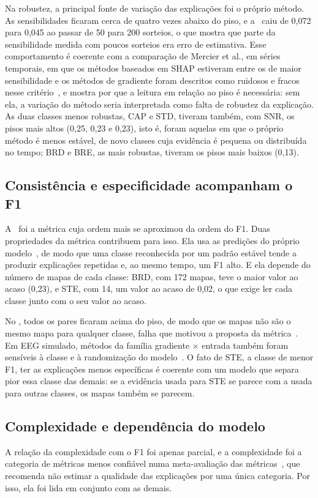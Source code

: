 Na robustez, a principal fonte de variação das explicações foi o próprio método. As sensibilidades ficaram cerca de quatro vezes abaixo do piso, e a \MS\ caiu de 0,072 para 0,045 ao passar de 50 para 200 sorteios, o que mostra que parte da sensibilidade medida com poucos sorteios era erro de estimativa. Esse comportamento é coerente com a comparação de Mercier et al., em séries temporais, em que os métodos baseados em SHAP estiveram entre os de maior sensibilidade e os métodos de gradiente foram descritos como ruidosos e fracos nesse critério~\cite{mercier2022}, e mostra por que a leitura em relação ao piso é necessária: sem ela, a variação do método seria interpretada como falta de robustez da explicação. As duas classes menos robustas, CAP e STD, tiveram também, com SNR, os pisos mais altos (0,25, 0,23 e 0,23), isto é, foram aquelas em que o próprio método é menos estável, de novo classes cuja evidência é pequena ou distribuída no tempo; BRD e BRE, as mais robustas, tiveram os pisos mais baixos (0,13).

\subsection{Consistência e especificidade acompanham o F1}
A \CS\ foi a métrica cuja ordem mais se aproximou da ordem do F1. Duas propriedades da métrica contribuem para isso. Ela usa as predições do próprio modelo~\cite{dasgupta2022}, de modo que uma classe reconhecida por um padrão estável tende a produzir explicações repetidas e, ao mesmo tempo, um F1 alto. E ela depende do número de mapas de cada classe: BRD, com 172 mapas, teve o maior valor ao acaso (0,23), e STE, com 14, um valor ao acaso de 0,02, o que exige ler cada classe junto com o seu valor ao acaso.

No \RL, todos os pares ficaram acima do piso, de modo que os mapas não são o mesmo mapa para qualquer classe, falha que motivou a proposta da métrica~\cite{sixt2020}. Em EEG simulado, métodos da família gradiente × entrada também foram sensíveis à classe e à randomização do modelo~\cite{ravindran2023}. O fato de STE, a classe de menor F1, ter as explicações menos específicas é coerente com um modelo que separa pior essa classe das demais: se a evidência usada para STE se parece com a usada para outras classes, os mapas também se parecem.

\subsection{Complexidade e dependência do modelo}
A relação da complexidade com o F1 foi apenas parcial, e a complexidade foi a categoria de métricas menos confiável numa meta-avaliação das métricas~\cite{hedstrom2023metaquantus}, que recomenda não estimar a qualidade das explicações por uma única categoria. Por isso, ela foi lida em conjunto com as demais.


